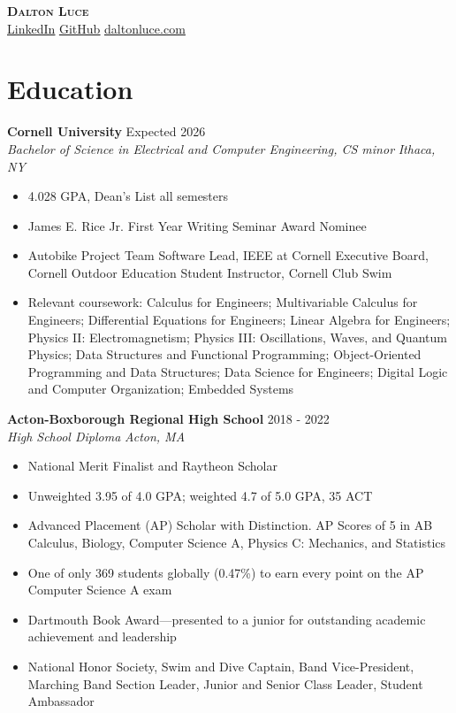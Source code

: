 \documentclass[letterpaper,8pt]{article}
\newcommand{\resumeEntry}[4]{
    \vspace{4pt}
    \large \textbf{#1}
    \normalsize \hfill #2
    \\
    \textit{#3} \hfill \textit{#4}
    \vspace{1pt}
}
\newcommand{\itemsBegin}{
    \begin{itemize}[leftmargin=0.2in, labelsep=0.05in, itemsep=0pt, parsep=1pt, topsep=0pt, partopsep=0pt]
}
\newcommand{\itemsEnd}{\end{itemize}}
\begin{document}
\textbf{\huge \scshape Dalton Luce} \\
\vspace{2pt}
\small
\addressConditional
\phoneConditional
\emailConditional
\href{https://www.linkedin.com/in/dalton-luce/}{\underline{LinkedIn}}
\hspace{10pt}
\href{https://github.com/da-luce}{\underline{GitHub}}
\hspace{10pt}
\href{https://daltonluce.com/}{\underline{daltonluce.com}}
\vspace{-5pt}

\section{Education}

    \resumeEntry
        {Cornell University}
        {Expected 2026}
        {Bachelor of Science in Electrical and Computer Engineering, CS minor}
        {Ithaca, NY}

    \itemsBegin
        \item 4.028 GPA, Dean’s List all semesters
        \item James E. Rice Jr. First Year Writing Seminar Award Nominee
        \item Autobike Project Team Software Lead, IEEE at Cornell Executive Board, Cornell Outdoor Education Student Instructor, Cornell Club Swim
        \item Relevant coursework: Calculus for Engineers; Multivariable Calculus for Engineers; Differential Equations for Engineers; Linear Algebra for Engineers; Physics II: Electromagnetism; Physics III: Oscillations, Waves, and Quantum Physics; Data Structures and Functional Programming; Object-Oriented Programming and Data Structures; Data Science for Engineers; Digital Logic and Computer Organization; Embedded Systems
    \itemsEnd

    \resumeEntry
        {Acton-Boxborough Regional High School}
        {2018 - 2022}
        {High School Diploma}
        {Acton, MA}

    \itemsBegin
        \item National Merit Finalist and Raytheon Scholar
        \item Unweighted 3.95 of 4.0 GPA; weighted 4.7 of 5.0 GPA, 35 ACT
        \item Advanced Placement (AP) Scholar with Distinction. AP Scores of 5 in AB Calculus, Biology, Computer Science A, Physics C: Mechanics, and Statistics
        \item One of only 369 students globally (0.47\%) to earn every point on the AP Computer Science A exam
        \item Dartmouth Book Award—presented to a junior for outstanding academic achievement and leadership
        \item National Honor Society, Swim and Dive Captain, Band Vice-President, Marching Band Section Leader, Junior and Senior Class Leader, Student Ambassador
    \itemsEnd
\end{document}
